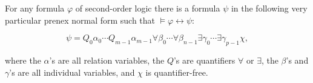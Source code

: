 For any formula $\varphi$ of second-order logic there is a formula $\psi$ in the following very particular prenex normal form such that $\models \varphi \leftrightarrow \psi$:

$$\psi = Q_0 \alpha_0 \cdots Q_{m-1} \alpha_{m-1} \forall \beta_0 \cdots \forall \beta_{n-1} \exists \gamma_0 \cdots \exists \gamma_{p-1} \chi,$$

where the $\alpha$'s are all relation variables, the $Q$'s are quantifiers $\forall$ or $\exists$, the $\beta$'s and $\gamma$'s are all individual variables, and $\chi$ is quantifier-free.
